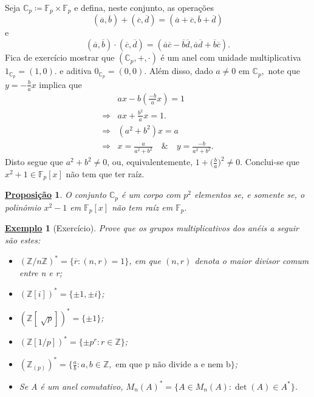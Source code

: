 \documentclass{article}
\newtheorem*{prop*}{\underline{Proposi\c c\~ao}}
\newtheorem{example}{\underline{Exemplo}}
\begin{document}
Seja \(\mathbb{C}_{p}\coloneqq \mathbb{F}_{p}\times \mathbb{F}_{p}\) e defina, neste conjunto, as operações 
\[
  (\overline{a}, \overline{b}) + (\overline{c}, \overline{d}) = (\overline{a}+\overline{c}, \overline{b}+\overline{d})
\]
e 
\[
  (\overline{a}, \overline{b})\cdot (\overline{c}, \overline{d}) = (\overline{a}\overline{c} - \overline{b}\overline{d}, \overline{a}\overline{d}+\overline{b}\overline{c}).
\]
Fica de exercício mostrar que \((\mathbb{C}_{p}, +, \cdot )\) é um anel com unidade multiplicativa \(1_{\mathbb{C}_{p}} = (1, 0).\) e aditiva \(0_{\mathbb{C}_{p}} = (0, 0).\)
Além disso, dado \(a\neq 0\) em \(\mathbb{C}_{p},\) note que \(y = -\frac{b}{a}x\) implica que 
\begin{align*}
  &ax - b(\frac{-b}{a}x) = 1\\
  \Rightarrow & ax + \frac{b^{2}}{a}x = 1.\\
  \Rightarrow & (a^{2} + b^{2})x = a\\
  \Rightarrow & x = \frac{a}{a^{2}+b^{2}} \quad\&\quad y = \frac{-b}{a^{2}+b^{2}}.
\end{align*}
Disto segue que \(a^{2} + b^{2}\neq 0\), ou, equivalentemente, \(1 + \biggl(\frac{b}{a}\biggr)^{2}\neq 0\). Conclui-se que \(x^{2}+1\in \mathbb{F}_{p}[x]\) não tem que ter raíz.
\begin{prop*}
  O conjunto \(\mathbb{C}_{p}\) é um corpo com \(p^{2}\) elementos se, e somente se, o polinômio \(x^{2}-1 \) em \(\mathbb{F}_{p}[x]\) não tem raíz em \(\mathbb{F}_{p}.\)
\end{prop*}
\begin{example}[Exercício]
  Prove que os grupos multiplicativos dos anéis a seguir são estes:
  \begin{itemize}
    \item[1)] \((\mathbb{Z}/n \mathbb{Z})^{*} = \{\overline{r}: (n, r) = 1\}\), em que \((n, r)\) denota o \textit{maior divisor comum} entre n e r;
    \item[2)] \((\mathbb{Z}[i])^{*}=\{\pm1, \pm i\}\);
    \item[3)] \((\mathbb{Z}[\sqrt[]{p}])^{*} = \{\pm1\}\);
    \item[4)] \((\mathbb{Z}[1/p])^{*} = \{\pm p^{r}: r\in \mathbb{Z}\}\);
    \item[5)] \((\mathbb{Z}_{(p)})^{*} = \biggl\{\frac{a}{b}: a, b\in \mathbb{Z}, \text{ em que p não divide a e nem b}\biggr\}\);
    \item[6)] Se A é um anel comutativo, \(M_{n}(A)^{*} = \{A\in M_{n}(A): \det{(A)}\in A^{*}\}\).
  \end{itemize}
\end{example}
\newpage
\end{document}

